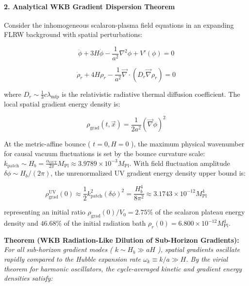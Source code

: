 \documentclass[11pt,a4paper]{article}
\theoremstyle{definition}\newtheorem{definition}{Definition}
\theoremstyle{remark}\newtheorem{remark}{Remark}
\begin{document}
\paragraph{2. Analytical WKB Gradient Dispersion Theorem}

Consider the inhomogeneous scalaron-plasma field equations in an expanding FLRW background with spatial perturbations:


\begin{equation}
\ddot{\phi} + 3H\dot{\phi} - \frac{1}{a^2}\nabla^2\phi + V'(\phi) = 0
\end{equation}



\begin{equation}
\dot{\rho}_r + 4H\rho_r - \frac{1}{a^2}\vec{\nabla} \cdot (D_r \vec{\nabla}\rho_r) = 0
\end{equation}


where $D_r \sim \frac{1}{3} c \lambda_{\text{mfp}}$ is the relativistic radiative thermal diffusion coefficient. The local spatial gradient energy density is:


\begin{equation}
\rho_{\text{grad}}(t, \vec{x}) = \frac{1}{2a^2} (\vec{\nabla}\phi)^2
\end{equation}


At the metric-affine bounce ( $t = 0, H = 0$ ), the maximum physical wavenumber for causal vacuum fluctuations is set by the bounce curvature scale: $k_{\text{patch}} \sim H_b = \frac{\alpha_{\text{GUT}}}{2\pi} M_{\text{Pl}} \approx 3.9789 \times 10^{-3} M_{\text{Pl}}$. With field fluctuation amplitude $\delta\phi \sim H_b / (2\pi)$, the unrenormalized UV gradient energy density upper bound is:


\begin{equation}
\rho_{\text{grad}}^{\text{UV}}(0) \approx \frac{1}{2} k_{\text{patch}}^2 (\delta\phi)^2 = \frac{H_b^4}{8\pi^2} \approx 3.1743 \times 10^{-12} M_{\text{Pl}}^4
\end{equation}


representing an initial ratio $\rho_{\text{grad}}(0) / V_0 = 2.75\%$ of the scalaron plateau energy density and $46.68\%$ of the initial radiation bath $\rho_r(0) = 6.800 \times 10^{-12} M_{\text{Pl}}^4$.

\textbf{Theorem (WKB Radiation-Like Dilution of Sub-Horizon Gradients):}
\textit{For all sub-horizon gradient modes ( $k \sim H_b \gg a H$ ), spatial gradients oscillate rapidly compared to the Hubble expansion rate $\omega_k \equiv k/a \gg H$. By the virial theorem for harmonic oscillators, the cycle-averaged kinetic and gradient energy densities satisfy:}
\end{document}
